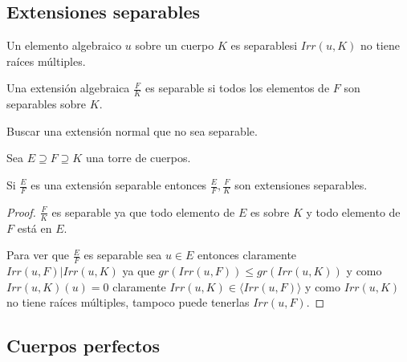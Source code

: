 \subsection{Extensiones separables}

\begin{definition}
Un elemento algebraico $u$ sobre un cuerpo $K$ es separablesi $Irr(u,K)$ no tiene raíces múltiples.

Una extensión algebraica $\frac{F}{K}$ es separable si todos los elementos de $F$ son separables sobre $K$.  
\end{definition}

\begin{exercise}
Buscar una extensión normal que no sea separable.
\end{exercise}

\begin{proposition}
Sea $E \supseteq F \supseteq K$ una torre de cuerpos. 

Si $\frac{E}{F}$ es una extensión separable entonces 
$\frac{E}{F},\frac{F}{K}$ son extensiones separables. 
\end{proposition}
\begin{proof}
$\frac{F}{K}$ es separable ya que todo elemento de $E$ es  sobre $K$ y todo elemento de $F$ está en $E$. 

Para ver que $\frac{E}{F}$ es separable sea $u \in E$ entonces claramente $Irr(u,F)|Irr(u,K)$ ya que $gr(Irr(u,F)) \le gr(Irr(u,K))$ y como $Irr(u,K)(u) = 0$ claramente $Irr(u,K) \in \langle Irr(u,F) \rangle$ y como $Irr(u,K)$ no tiene raíces múltiples, tampoco puede tenerlas $Irr(u,F)$. 
\end{proof}

\subsection{Cuerpos perfectos}

